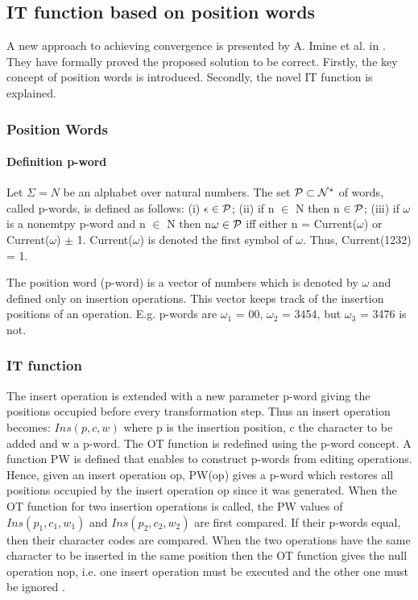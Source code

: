 \subsection{IT function based on position words}
\label{otf:imor}

A new approach to achieving convergence is presented by A. Imine et al. in \cite{imine04}. They have formally proved the proposed solution to be correct. Firstly, the key concept of position words is introduced. Secondly, the novel IT function is explained.

\subsubsection{Position Words}
\paragraph{Definition p-word} Let $\Sigma = N$ be an alphabet over natural numbers. The set $\cal P \subset N^*$ of words, called p-words, is defined as follows: (i) $\epsilon \in \cal P$; (ii) if n $\in$ N then n $\in \cal P$; (iii) if $\omega$ is a nonemtpy p-word and n $\in$ N then n$\omega \in \cal P$ iff either n = Current($\omega$) or Current($\omega$) $\pm$ 1. Current($\omega$) is denoted the first symbol of $\omega$. Thus, Current(1232) = 1.

The position word (p-word) is a vector of numbers which is denoted by $\omega$ and defined only on insertion operations. This vector keeps track of the insertion positions of an operation. E.g. p-words are $\omega_{1}$ = 00, $\omega_{2}$ = 3454, but $\omega_{3}$ = 3476 is not. 

\subsubsection{IT function}
The insert operation is extended with a new parameter p-word giving the positions occupied before every transformation step. Thus an insert operation becomes: $Ins(p,c,w)$ where p is the insertion position, c the character to be added and w a p-word.
The OT function is redefined using the p-word concept. A function PW is defined that enables to construct p-words from editing operations. Hence, given an insert operation op, PW(op) gives a p-word which restores all positions occupied by the insert operation op since it was generated. 
When the OT function for two insertion operations is called, the PW values of $Ins(p_1,c_1,w_1)$ and $Ins(p_2,c_2,w_2)$ are first compared. If their p-words equal, then their character codes are compared. When the two operations have the same character to be inserted in the same position then the OT function gives the null operation nop, i.e. one insert operation must be executed and the other one must be ignored \cite{suleiman98}.

